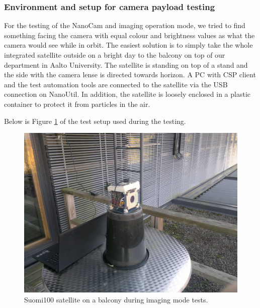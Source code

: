 \documentclass[english,12pt,a4paper,pdftex,elec,utf8]{aaltothesis}
\begin{document}
\subsubsection{Environment and setup for camera payload testing}
For the testing of the NanoCam and imaging operation mode, we tried to find something facing the camera with equal colour and brightness values as what the camera would see while in orbit. The easiest solution is to simply take the whole integrated satellite outside on a bright day to the balcony on top of our department in Aalto University. The satellite is standing on top of a stand and the side with the camera lense is directed towards horizon. A PC with CSP client and the test automation tools are connected to the satellite via the USB connection on NanoUtil. In addition, the satellite is loosely enclosed in a plastic container to protect it from particles in the air.\par 
Below is Figure \ref{camerabalcony} of the test setup used during the testing.\par 
\begin{figure}[h!]
\centering
\includegraphics[scale=0.3]{camerabucketspurgu}
\caption{Suomi100 satellite on a balcony during imaging mode tests.}
\label{camerabalcony}
\end{figure} 
\end{document}
